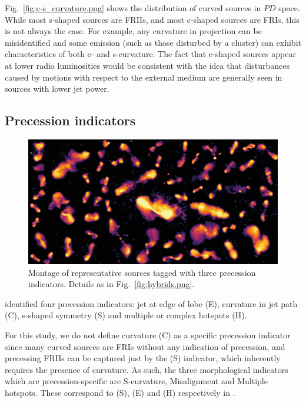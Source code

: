 \documentclass{aa}
\begin{document}
Fig.~\ref{fig:c-s_curvature.png} shows the distribution of curved sources in $PD$ space. While most s-shaped sources are FRIIs, and most c-shaped sources are FRIs, this is not always the case. For example, any curvature in projection can be misidentified and some emission (such as those disturbed by a cluster) can exhibit characteristics of both c- and s-curvature. The fact that c-shaped sources appear at lower radio luminosities would be consistent with the idea that disturbances caused by motions with respect to the external medium are generally seen in sources with lower jet power.

\subsection{Precession indicators}
\label{sec:precession}
\begin{figure}
\includegraphics[width=1\linewidth]{Images/galaxies/precession.png}
\caption{Montage of representative sources tagged with three precession indicators. Details as in Fig.\ \ref{fig:hybrids.png}.}
\label{fig:precession.png}
\end{figure}

\cite{krause18} identified four precession indicators: jet at edge of lobe (E), curvature in jet path (C), s-shaped symmetry (S) and multiple or complex hotspots (H). 

For this study, we do not define curvature (C) as a specific precession indicator since many curved sources are FRIs without any indication of precession, and precessing FRIIs can be captured just by the (S) indicator, which inherently requires the presence of curvature. As such, the three morphological indicators which are precession-specific are S-curvature, Misalignment and Multiple hotspots. These correspond to (S), (E) and (H) respectively in \cite{krause18}. 
\end{document}
